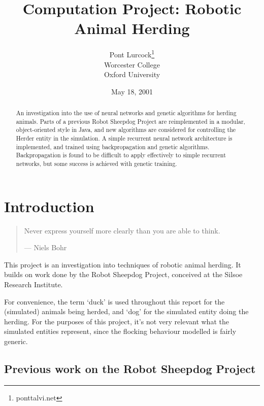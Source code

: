 \documentclass[a4paper]{report}
\begin{document}
\title{Computation Project: Robotic Animal Herding}

\date{May 18, 2001}
\author{Pont Lurcock\thanks{ponttalvi.net}\\
  Worcester College\\Oxford University}

\maketitle

\begin{abstract}
  An investigation into the use of neural networks and genetic
  algorithms for herding animals. Parts of a previous Robot Sheepdog
  Project are reimplemented in a modular, object-oriented style in
  Java, and new algorithms are considered for controlling the Herder
  entity in the simulation. A simple recurrent neural network
  architecture is implemented, and trained using backpropagation and
  genetic algorithms. Backpropagation is found to be difficult
  to apply effectively to simple recurrent networks, but some success
  is achieved with genetic training.
\end{abstract}

\tableofcontents

\chapter{Introduction}

\begin{quote}
Never express yourself more clearly than you are able to think.

{\hspace{5cm}--- Niels Bohr}
\end{quote}
\bigskip

This project is an investigation into techniques of robotic animal
herding. It builds on work done by the Robot Sheepdog Project,
conceived at the Silsoe Research Institute.

For convenience, the term `duck' is used throughout this report for
the (simulated) animals being herded, and `dog' for the simulated
entity doing the herding. For the purposes of this project, it's not
very relevant what the simulated entities represent, since the
flocking behaviour modelled is fairly generic.

\section{Previous work on the Robot Sheepdog Project}
\end{document}
